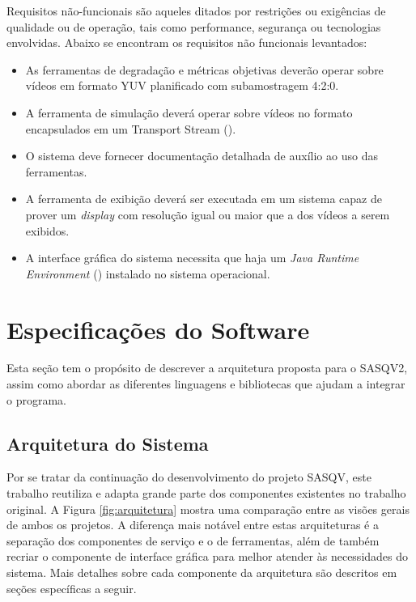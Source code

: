 Requisitos não-funcionais são aqueles ditados por restrições ou exigências de qualidade ou de operação, tais como performance, segurança ou tecnologias envolvidas.
Abaixo se encontram os requisitos não funcionais levantados:


\begin{itemize}
	\item As ferramentas de degradação e métricas objetivas deverão operar sobre vídeos em formato YUV planificado com subamostragem 4:2:0.
	\item A ferramenta de simulação deverá operar sobre vídeos no formato  encapsulados em um Transport Stream ().
	\item O sistema deve fornecer documentação detalhada de auxílio ao uso das ferramentas.
	\item A ferramenta de exibição deverá ser executada em um sistema capaz de prover um \emph{display} com resolução igual ou maior que a dos vídeos a serem exibidos.
	\item A interface gráfica do sistema necessita que haja um \emph{Java Runtime Environment} () instalado no sistema operacional.
\end{itemize}

\section{Especificações do Software}

Esta seção tem o propósito de descrever a arquitetura proposta para o SASQV2, assim como abordar as diferentes linguagens e bibliotecas que ajudam a integrar o programa.

\subsection{Arquitetura do Sistema}

Por se tratar da continuação do desenvolvimento do projeto SASQV, este trabalho reutiliza e adapta grande parte dos componentes existentes no trabalho original. 
A Figura \ref{fig:arquitetura} mostra uma comparação entre as visões gerais de ambos os projetos. A diferença mais notável entre estas arquiteturas é a separação dos componentes de serviço e o de ferramentas, além de também recriar o componente de interface gráfica para melhor atender às necessidades do sistema. 
Mais detalhes sobre cada componente da arquitetura são descritos em seções específicas a seguir.

